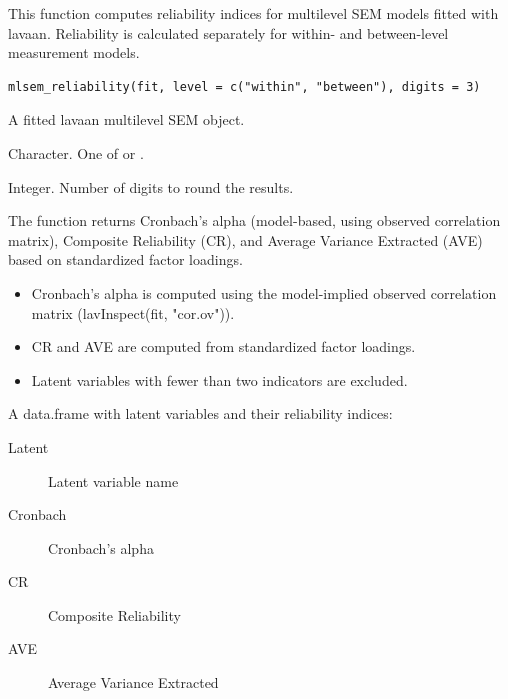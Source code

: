 \documentclass[a4paper]{book}
\begin{document}
%
\begin{Description}
This function computes reliability indices for multilevel SEM models
fitted with lavaan. Reliability is calculated separately for within-
and between-level measurement models.
\end{Description}
%
\begin{Usage}
\begin{verbatim}
mlsem_reliability(fit, level = c("within", "between"), digits = 3)
\end{verbatim}
\end{Usage}
%
\begin{Arguments}
\begin{ldescription}
\item[\code{fit}] A fitted lavaan multilevel SEM object.

\item[\code{level}] Character. One of  or .

\item[\code{digits}] Integer. Number of digits to round the results.
\end{ldescription}
\end{Arguments}
%
\begin{Details}
The function returns Cronbach's alpha (model-based, using observed
correlation matrix), Composite Reliability (CR), and Average Variance
Extracted (AVE) based on standardized factor loadings.


\begin{itemize}

\item{} Cronbach's alpha is computed using the model-implied observed
correlation matrix (lavInspect(fit, "cor.ov")).
\item{} CR and AVE are computed from standardized factor loadings.
\item{} Latent variables with fewer than two indicators are excluded.

\end{itemize}

\end{Details}
%
\begin{Value}
A data.frame with latent variables and their reliability indices:
\begin{description}

\item[Latent] Latent variable name
\item[Cronbach] Cronbach's alpha
\item[CR] Composite Reliability
\item[AVE] Average Variance Extracted

\end{description}

\end{Value}
\end{document}
